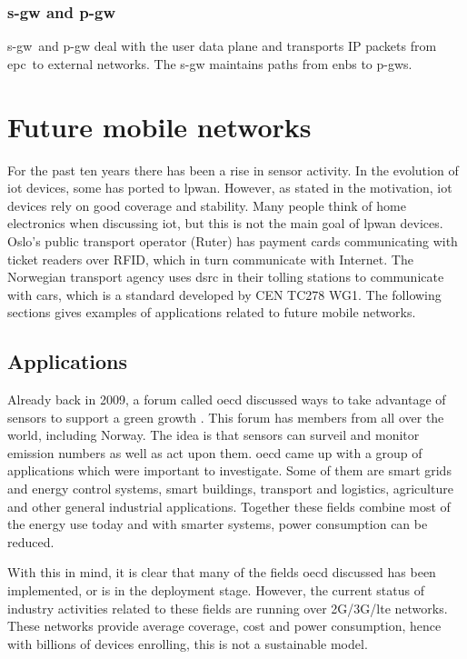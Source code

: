 \documentclass[USenglish]{ifimaster}  %
\begin{document}
\subsubsection{\acrshort{s-gw} and \acrshort{p-gw}}
\acrfull{s-gw} and \acrfull{p-gw} deal with the user data plane and transports IP packets from \acrshort{epc} to external networks. The \acrshort{s-gw} maintains paths from \acrshort{enb}s to \acrshort{p-gw}s.

\section{Future mobile networks} \label{section:futureapplications}
For the past ten years there has been a rise in sensor activity. In the evolution of \acrshort{iot} devices, some has ported to \acrshort{lpwan}. However, as stated in the motivation, \acrshort{iot} devices rely on good coverage and stability. Many people think of home electronics when discussing \acrshort{iot}, but this is not the main goal of \acrshort{lpwan} devices. Oslo's public transport operator (Ruter) has payment cards communicating with ticket readers over RFID, which in turn communicate with Internet. The Norwegian transport agency uses \acrfull{dsrc} in their tolling stations to communicate with cars, which is a standard developed by CEN TC278 WG1\cite{EFCCENTC29:online}. The following sections gives examples of applications related to future mobile networks.

\subsection{Applications} \label{ssection:applications}
Already back in 2009, a forum called \acrfull{oecd} discussed ways to take advantage of sensors to support a green growth \cite{online:industryApplications}. This forum has members from all over the world, including Norway. The idea is that sensors can surveil and monitor emission numbers as well as act upon them. \acrshort{oecd} came up with a group of applications which were important to investigate. Some of them are smart grids and energy control systems, smart buildings, transport and logistics, agriculture and other general industrial applications. Together these fields combine most of the energy use today and with smarter systems, power consumption can be reduced.

With this in mind, it is clear that many of the fields \acrshort{oecd} discussed has been implemented, or is in the deployment stage. However, the current status of industry activities related to these fields are running over 2G/3G/\acrshort{lte} networks. These networks provide average coverage, cost and power consumption, hence with billions of devices enrolling, this is not a sustainable model.
\end{document}
